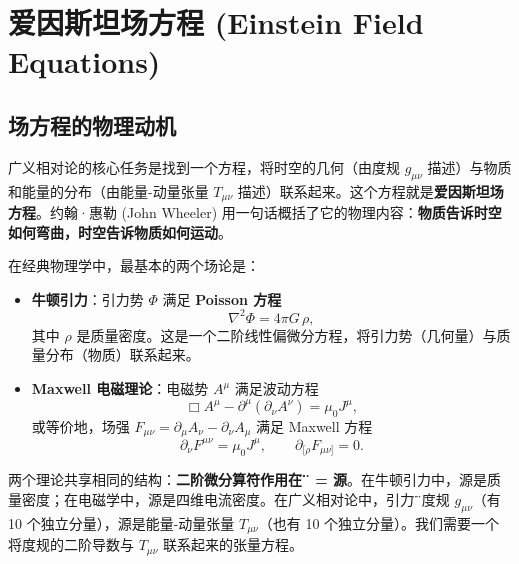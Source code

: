 \chapter{爱因斯坦场方程 (Einstein Field Equations)}
\label{chap:einstein}

\section{场方程的物理动机}
\label{sec:motivation}

广义相对论的核心任务是找到一个方程，将时空的几何（由度规 $g_{\mu\nu}$ 描述）与物质和能量的分布（由能量-动量张量 $T_{\mu\nu}$ 描述）联系起来。这个方程就是\textbf{爱因斯坦场方程}。约翰·惠勒 (John Wheeler) 用一句话概括了它的物理内容：\textbf{物质告诉时空如何弯曲，时空告诉物质如何运动}。

\begin{note}[从经典场论看场方程的必要性]
在经典物理学中，最基本的两个场论是：
\begin{itemize}
    \item \textbf{牛顿引力}：引力势 $\Phi$ 满足 \textbf{Poisson 方程}
    \begin{equation}
        \nabla^2 \Phi = 4\pi G \,\rho,
    \end{equation}
    其中 $\rho$ 是质量密度。这是一个二阶线性偏微分方程，将引力势（几何量）与质量分布（物质）联系起来。
    \item \textbf{ Maxwell 电磁理论}：电磁势 $A^\mu$ 满足波动方程
    \begin{equation}
        \Box A^\mu - \partial^\mu(\partial_\nu A^\nu) = \mu_0 J^\mu,
    \end{equation}
    或等价地，场强 $F_{\mu\nu} = \partial_\mu A_\nu - \partial_\nu A_\mu$ 满足 Maxwell 方程
    \begin{equation}
        \partial_\nu F^{\mu\nu} = \mu_0 J^\mu, \qquad \partial_{[\rho}F_{\mu\nu]} = 0.
    \end{equation}
\end{itemize}
两个理论共享相同的结构：\textbf{二阶微分算符作用在\"势\"上 = 源}。在牛顿引力中，源是质量密度；在电磁学中，源是四维电流密度。在广义相对论中，引力\"势\"是度规 $g_{\mu\nu}$（有 10 个独立分量），源是能量-动量张量 $T_{\mu\nu}$（也有 10 个独立分量）。我们需要一个将度规的二阶导数与 $T_{\mu\nu}$ 联系起来的张量方程。
\end{note}

